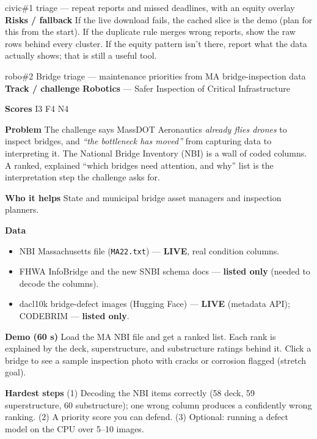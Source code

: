 \documentclass[11pt]{article}
\newcommand{\LIVE}{\textcolor{okgreen}{\textbf{LIVE}}}
\newcommand{\LISTED}{\textcolor{greyish}{\textbf{listed only}}}
\newcommand{\tagR}{\textcolor{robo}{\textbf{Robotics}}}
\newcommand{\field}[1]{\textbf{\textsf{#1}}\quad}
\begin{document}
\begin{ideacard}{civic}{\#1  triage --- repeat reports and missed deadlines, with an equity overlay}
\field{Risks / fallback} If the live download fails, the cached slice is the demo (plan for
this from the start). If the duplicate rule merges wrong reports, show the raw rows behind
every cluster. If the equity pattern isn't there, report what the data actually shows; that
is still a useful tool.
\end{ideacard}

\begin{ideacard}{robo}{\#2 \quad Bridge triage --- maintenance priorities from MA bridge-inspection data}
\field{Track / challenge} \tagR{} --- Safer Inspection of Critical Infrastructure\par
\field{Scores} I3 F4 N4

\field{Problem} The challenge says MassDOT Aeronautics \emph{already flies drones} to inspect
bridges, and \emph{``the bottleneck has moved''} from capturing data to interpreting it. The
National Bridge Inventory (NBI) is a wall of coded columns. A ranked, explained
``which bridges need attention, and why'' list is the interpretation step the challenge
asks for.

\field{Who it helps} State and municipal bridge asset managers and inspection planners.

\field{Data}
\begin{itemize}
\item NBI Massachusetts file (\texttt{MA22.txt}) --- \LIVE, real condition columns.
\item FHWA InfoBridge and the new SNBI schema docs --- \LISTED{} (needed to decode the columns).
\item dacl10k bridge-defect images (Hugging Face) --- \LIVE{} (metadata API); CODEBRIM --- \LISTED.
\end{itemize}

\field{Demo (60 s)} Load the MA NBI file and get a ranked list. Each rank is explained by the
deck, superstructure, and substructure ratings behind it. Click a bridge to see a sample
inspection photo with cracks or corrosion flagged (stretch goal).

\field{Hardest steps} (1) Decoding the NBI items correctly (58 deck, 59 superstructure,
60 substructure); one wrong column produces a confidently wrong ranking. (2) A priority
score you can defend. (3) Optional: running a defect model on the CPU over 5--10 images.


\end{ideacard}
\end{document}

